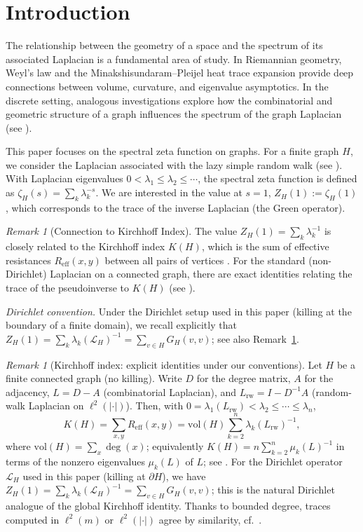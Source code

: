 \documentclass{article}
\numberwithin{equation}{section}
\theoremstyle{definition}
\theoremstyle{remark}
\newtheorem{remark}[theorem]{Remark}
\newcommand{\LL}{\mathcal{L}}
\newcommand{\Reff}{R_{\mathrm{eff}}}
\begin{document}
\section{Introduction}

The relationship between the geometry of a space and the spectrum of its associated Laplacian is a fundamental area of study. In Riemannian geometry, Weyl's law and the Minakshisundaram--Pleijel heat trace expansion provide deep connections between volume, curvature, and eigenvalue asymptotics. In the discrete setting, analogous investigations explore how the combinatorial and geometric structure of a graph influences the spectrum of the graph Laplacian (see \cite{Chung97}).

This paper focuses on the spectral zeta function on graphs. For a finite graph $H$, we consider the Laplacian associated with the lazy simple random walk (see ). With Laplacian eigenvalues $0 < \lambda_1 \leq \lambda_2 \leq \cdots$, the spectral zeta function is defined as $\zeta_H(s) = \sum_k \lambda_k^{-s}$. We are interested in the value at $s=1$, $Z_H(1) := \zeta_H(1)$, which corresponds to the trace of the inverse Laplacian (the Green operator).

\begin{remark}[Connection to Kirchhoff Index]\label{rem:kirchhoff}
The value $Z_H(1) = \sum_k \lambda_k^{-1}$ is closely related to the Kirchhoff index $K(H)$, which is the sum of effective resistances $\Reff(x,y)$ between all pairs of vertices \cite{KleinRandic93}. For the standard (non-Dirichlet) Laplacian on a connected graph, there are exact identities relating the trace of the pseudoinverse to $K(H)$ (see \cite[Chapter 9]{LyonsPeres16}).
\end{remark}

\noindent\textit{Dirichlet convention.} Under the Dirichlet setup used in this paper (killing at the boundary of a finite domain),
we recall explicitly that
$Z_H(1)=\sum_k \lambda_k(\LL_H)^{-1}=\sum_{v\in H} G_H(v,v)$; see also Remark~\ref{rem:kirchhoff-precise}.

\begin{remark}[Kirchhoff index: explicit identities under our conventions]\label{rem:kirchhoff-precise}
Let $H$ be a finite connected graph (no killing). Write $D$ for the degree matrix, $A$ for the adjacency, $L=D-A$ (combinatorial Laplacian), and $L_{\mathrm{rw}}=I-D^{-1}A$ (random-walk Laplacian on $\ell^2(|\cdot|)$). Then, with $0=\lambda_1(L_{\mathrm{rw}})<\lambda_2\le\cdots\le\lambda_n$,
\[
  K(H)=\sum_{x,y}\Reff(x,y)=\mathrm{vol}(H)\sum_{k=2}^n \lambda_k(L_{\mathrm{rw}})^{-1},
\]
where $\mathrm{vol}(H)=\sum_{x}\deg(x)$; equivalently $K(H)=n\sum_{k=2}^n \mu_k(L)^{-1}$ in terms of the nonzero eigenvalues $\mu_k(L)$ of $L$; see \cite[Thm.~9.23]{LyonsPeres16}. For the Dirichlet operator $\LL_H$ used in this paper (killing at $\partial H$), we have $Z_H(1)=\sum_k\lambda_k(\LL_H)^{-1}=\sum_{v\in H}G_H(v,v)$; this is the natural Dirichlet analogue of the global Kirchhoff identity. Thanks to bounded degree, traces computed in $\ell^2(m)$ or $\ell^2(|\cdot|)$ agree by similarity, cf.\ .
\end{remark}
\end{document}
